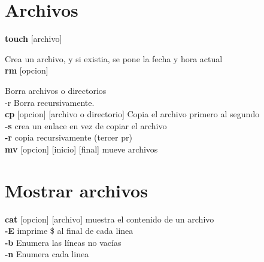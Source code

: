 \documentclass[11pt]{article}
\begin{document}
\section{Archivos}
\textbf{touch} [archivo] 

\hspace{2cm} Crea un archivo, y si existia, se pone la fecha y hora actual
\\

\textbf{rm} [opcion] 

\hspace{2cm} Borra archivos o directorios\\

\hspace{2cm} -r 
\hspace{2cm}Borra recursivamente.\\

\textbf{cp} [opcion] [archivo o directorio] \hspace{2cm} Copia el archivo primero al segundo\\

\hspace{2cm}\textbf{-s} crea un enlace en vez de copiar el archivo\\

\hspace{2cm} \textbf{-r} copia recursivamente (tercer pr)\\

\textbf{mv} [opcion] [inicio] [final] \hspace{2cm} mueve archivos \\

\section{Mostrar archivos}

\textbf{cat} [opcion] [archivo] \hspace{2cm} muestra el contenido de un archivo\\

\hspace{2cm} \textbf{-E} \hspace{2cm} imprime \$ al final de cada linea\\

\hspace{2cm} \textbf{-b} \hspace{2cm} Enumera las líneas no vacías\\

\hspace{2cm} \textbf{-n} \hspace{2cm} Enumera cada linea\\
\end{document}

